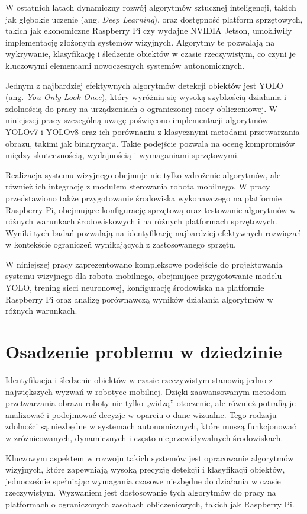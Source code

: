 \documentclass[a4paper,twoside,12pt]{book}
\begin{document}
W ostatnich latach dynamiczny rozwój algorytmów sztucznej inteligencji, takich jak głębokie uczenie (ang. \textit{Deep Learning}), oraz dostępność platform sprzętowych, takich jak ekonomiczne Raspberry Pi czy wydajne NVIDIA Jetson, umożliwiły implementację złożonych systemów wizyjnych. Algorytmy te pozwalają na wykrywanie, klasyfikację i śledzenie obiektów w czasie rzeczywistym, co czyni je kluczowymi elementami nowoczesnych systemów autonomicznych.

Jednym z najbardziej efektywnych algorytmów detekcji obiektów jest YOLO (ang. \textit{You Only Look Once}), który wyróżnia się wysoką szybkością działania i zdolnością do pracy na urządzeniach o ograniczonej mocy obliczeniowej. W niniejszej pracy szczególną uwagę poświęcono implementacji algorytmów YOLOv7 i YOLOv8 oraz ich porównaniu z klasycznymi metodami przetwarzania obrazu, takimi jak binaryzacja. Takie podejście pozwala na ocenę kompromisów między skutecznością, wydajnością i wymaganiami sprzętowymi.

Realizacja systemu wizyjnego obejmuje nie tylko wdrożenie algorytmów, ale również ich integrację z modułem sterowania robota mobilnego. W pracy przedstawiono także przygotowanie środowiska wykonawczego na platformie Raspberry Pi, obejmujące konfigurację sprzętową oraz testowanie algorytmów w różnych warunkach środowiskowych i na różnych platformach sprzętowych. Wyniki tych badań pozwalają na identyfikację najbardziej efektywnych rozwiązań w kontekście ograniczeń wynikających z zastosowanego sprzętu.

W niniejszej pracy zaprezentowano kompleksowe podejście do projektowania systemu wizyjnego dla robota mobilnego, obejmujące przygotowanie modelu YOLO, trening sieci neuronowej, konfigurację środowiska na platformie Raspberry Pi oraz analizę porównawczą wyników działania algorytmów w różnych warunkach.
\newpage
\section{Osadzenie problemu w dziedzinie}
Identyfikacja i śledzenie obiektów w czasie rzeczywistym stanowią jedno z największych wyzwań w robotyce mobilnej. Dzięki zaawansowanym metodom przetwarzania obrazu roboty nie tylko „widzą” otoczenie, ale również potrafią je analizować i podejmować decyzje w oparciu o dane wizualne. Tego rodzaju zdolności są niezbędne w systemach autonomicznych, które muszą funkcjonować w zróżnicowanych, dynamicznych i często nieprzewidywalnych środowiskach.

Kluczowym aspektem w rozwoju takich systemów jest opracowanie algorytmów wizyjnych, które zapewniają wysoką precyzję detekcji i klasyfikacji obiektów, jednocześnie spełniając wymagania czasowe niezbędne do działania w czasie rzeczywistym. Wyzwaniem jest dostosowanie tych algorytmów do pracy na platformach o ograniczonych zasobach obliczeniowych, takich jak Raspberry Pi.
\end{document}
